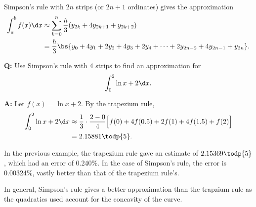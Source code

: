 \begin{recipe}
    Simpson's rule with $2n$ strips (or $2n+1$ ordinates) gives the approximation
    \begin{align*}
        \int_a^b f(x) \d x &\approx \sum_{k = 0}^n \frac{h}{3} (y_{2k} + 4y_{2k+1} + y_{2k+2})\\
        &= \frac{h}{3} \bs{y_0 + 4y_1 + 2y_2 + 4y_3 + 2y_4 + \dots + 2y_{2n-2} + 4y_{2n-1} + y_{2n}}.
    \end{align*}
\end{recipe}

\begin{example}
    \phantom{.}

    \textbf{Q:} Use Simpson's rule with 4 strips to find an approximation for \[\int_0^2 \ln{x + 2} \d x.\]
    
    \textbf{A:} Let $f(x) = \ln{x+2}$. By the trapezium rule,
    \begin{align*}
        \int_0^2 \ln{x + 2} \d x &\approx \frac{1}{3} \cdot \frac{2 - 0}{4} \Big[f(0) + 4f(0.5) + 2f(1) + 4f(1.5) + f(2)\Big] \\
        &= 2.15881 \todp{5}.
    \end{align*}

    In the previous example, the trapezium rule gave an estimate of $2.15369 \todp{5}$, which had an error of 0.240\%. In the case of Simpson's rule, the error is 0.00324\%, vastly better than that of the trapezium rule's.
\end{example}

In general, Simpson's rule gives a better approximation than the trapzium rule as the quadratics used account for the concavity of the curve.